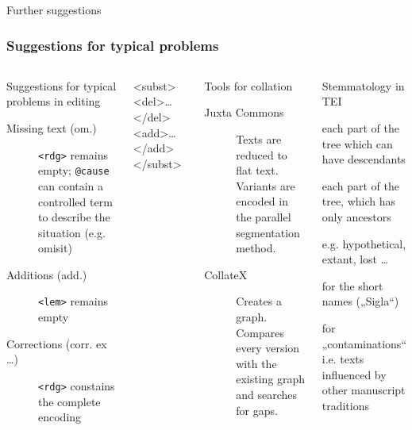 \begin{frame}[fragile]{Further suggestions}
\subsubsection{Suggestions for typical problems}

\begin{columns}
\begin{alertblock}{Suggestions for typical problems in editing}\footnotesize
\begin{description}
\item[Missing text (om.)] \texttt{<rdg>} remains empty; \texttt{@cause} can contain a controlled term to describe the situation (e.g. omisit)
\item[Additions (add.)] \texttt{<lem>} remains empty
\item[Corrections (corr. ex \dots)] \texttt{<rdg>} constains the complete encoding 
\end{description}
\end{alertblock}

\begin{xmlcode}
<subst><del>…</del><add>…</add></subst>
\end{xmlcode}

\scriptsize
\begin{block}{Tools for collation}
\begin{description}
\item[Juxta Commons] Texts are reduced to flat text. Variants are encoded in the parallel segmentation method.
\item[CollateX] Creates a graph. Compares every version with the existing graph and searches for gaps.
\end{description}
\end{block}

\begin{alertblock}{Stemmatology in TEI}
\begin{description}\scriptsize
\item[<eTree>]  each part of the tree which can have descendants
\item[<eLeaf>]  each part of the tree, which has only ancestors
\item[@type]  e.g. hypothetical, extant, lost \dots
\item[<label>]  for the short names („Sigla“)
\item[<ptr>]  for „contaminations“ i.e. texts influenced by other manuscript traditions
\end{description}
\end{alertblock}
\end{columns}


\end{frame}



